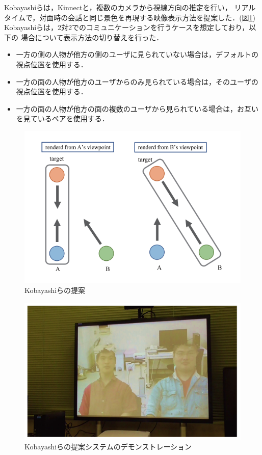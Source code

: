 Kobayashiら\cite{29}は，Kinnectと，複数のカメラから視線方向の推定を行い，
リアルタイムで，対面時の会話と同じ景色を再現する映像表示方法を提案した．(図\ref{Kobayashi})
Kobayashiらは，2対2でのコミュニケーションを行うケースを想定しており，以下の
場合について表示方法の切り替えを行った．
\begin{itemize}
  \item 一方の側の人物が他方の側のユーザに見られていない場合は，デフォルトの視点位置を使用する．
  \item  一方の面の人物が他方のユーザからのみ見られている場合は，そのユーザの視点位置を使用する．
  \item  一方の面の人物が他方の面の複数のユーザから見られている場合は，お互いを見ているペアを使用する．
\end{itemize}

\begin{figure}[tp]
  \centering
  \includegraphics[scale=0.8]{fig/gaze.png}
  \caption{Kobayashiらの提案\cite{29}}\label{Kobayashi}
\end{figure}

\begin{figure}[tp]
  \centering
  \includegraphics[scale=0.8]{fig/kobayashi2.png}
  \caption{Kobayashiらの提案システムのデモンストレーション\cite{29}}
\end{figure}



